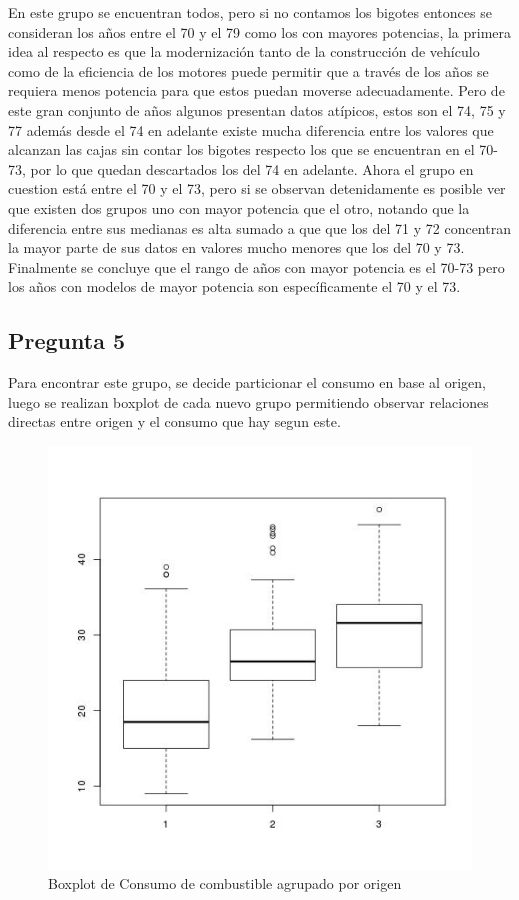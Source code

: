 \documentclass[letter,10pt]{article}
\begin{document}
En este grupo se encuentran todos, pero si no contamos los bigotes entonces se consideran los años
entre el 70 y el 79 como los con mayores potencias, la primera idea al respecto es que la modernización tanto de la construcción
de vehículo como de la eficiencia de los motores puede permitir que a través de los años se requiera menos potencia para que estos
puedan moverse adecuadamente. Pero de este gran conjunto de años algunos presentan datos atípicos, estos son el 74, 75 y 77 además desde el 74 en adelante existe
mucha diferencia entre los valores que alcanzan las cajas sin contar los bigotes respecto los que se encuentran en el 70-73, por lo que quedan descartados los del 74 en adelante.
Ahora el grupo en cuestion está entre el 70 y el 73, pero si se observan detenidamente es posible ver que existen dos grupos uno con mayor potencia que el otro, 
notando que la diferencia entre sus medianas es alta sumado a que que los del 71 y 72
concentran la mayor parte de sus datos en valores mucho menores que los del 70 y 73.
Finalmente se concluye que el rango de años con mayor potencia es el 70-73 pero los años con modelos de mayor potencia son específicamente el 70 y el 73.

\newpage
\subsection{Pregunta 5}

Para encontrar este grupo, se decide particionar el consumo en base al origen, luego se realizan boxplot de cada nuevo grupo
permitiendo observar relaciones directas entre origen y el consumo que hay segun este.
\begin{figure}[h!]
    \centering
    \includegraphics[scale=0.5]{boxplot_mpg_origin.jpg}
    \caption{Boxplot de Consumo de combustible agrupado por origen}
    \label{fig:boxplot_mpg_origin}
\end{figure}
\end{document}
